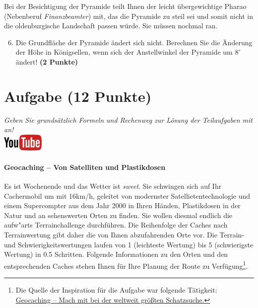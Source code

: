 \documentclass[a4paper, 9pt]{scrartcl}\usepackage[]{graphicx}\usepackage[]{xcolor}
\begin{document}
Bei der Besichtigung der Pyramide teilt Ihnen der leicht {\"u}bergewichtige
Pharao (Nebenberuf \textit{Finanzbeamter}) mit, das die Pyramide zu
steil sei und somit nicht in die oldenburgische Landschaft passen
w{\"u}rde. Sie m{\"u}ssen nochmal ran.

\begin{enumerate}
  \setcounter{enumi}{5}
\item Die Grundfl{\"a}che der Pyramide {\"a}ndert sich nicht. Berechnen Sie die
  {\"A}nderung der H{\"o}he in K{\"o}nigsellen, wenn sich der Anstellwinkel der
  Pyramide um $8^\circ$ {\"a}ndert!  \textbf{(2 Punkte)}
\end{enumerate}



\clearpage

\section{Aufgabe \hfill (12 Punkte)}

\textit{Geben Sie grunds{\"a}tzlich Formeln und Rechenweg zur L{\"o}sung der
  Teilaufgaben mit an!} \\[1Ex]

\hfill\href{https://youtu.be/3LAq3R0rS14}{\includegraphics[width =
  2cm]{img/youtube}} %
\hspace{2Ex}

\paragraph{Geocaching -- Von Satelliten und Plastikdosen}



Es ist Wochenende und das Wetter ist \textit{sweet}. Sie schwingen sich auf
Ihr Cachermobil um mit 16km/h, geleitet von modernster
Satellietentechnologie und einem Supercompter aus dem Jahr 2000 in Ihren
H{\"a}nden, Plastikdosen in der Natur und an sehenswerten Orten zu finden. Sie
wollen diesmal endlich die aufw{"a}rts Terrainchallenge
durchf{\"u}hren. Die Reihenfolge der Caches nach Terrainwertung gibt daher
die von Ihnen abzufahrenden Orte vor. Die Terrain- und
Schwierigkeitswertungen laufen von 1 (leichteste Wertung) bis 5
(schwierigste Wertung) in 0.5 Schritten. Folgende Informationen zu den
Orten und den entsprechenden Caches stehen Ihnen f{\"u}r Ihre Planung der Route
zu Verf{\"u}gung\footnote{Die Quelle der Inspiration
  für die Aufgabe war folgende Tätigkeit:
  \href{https://www.geocaching.com/play}{Geocaching -- Mach mit bei der weltweit größten Schatzsuche.}}.
\end{document}
